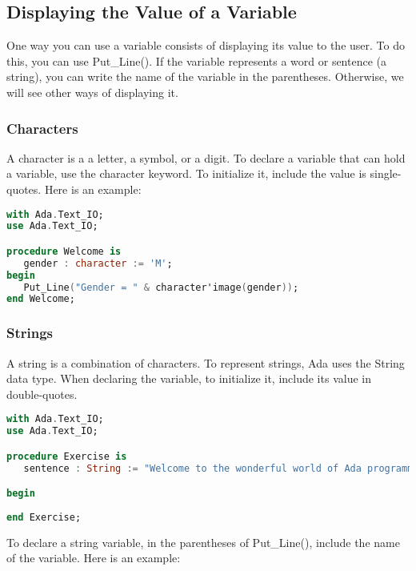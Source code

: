 \documentclass[12pt]{book}
\begin{document}
\subsection{Displaying the Value of a Variable}

One way you can use a variable consists of displaying its value to the user. To do this, you can use Put\_Line(). If the variable represents a word or sentence (a string), you can write the name of the variable in the parentheses. Otherwise, we will see other ways of displaying it.

\subsubsection{Characters}

A character is a a letter, a symbol, or a digit. To declare a variable that can hold a variable, use the character keyword. To initialize it, include the value is single-quotes. Here is an example:

\lstset{style=mystyle}
\begin{lstlisting}[language=Ada, caption=Ada example]
with Ada.Text_IO;
use Ada.Text_IO;

procedure Welcome is
   gender : character := 'M';
begin
   Put_Line("Gender = " & character'image(gender));
end Welcome;
\end{lstlisting}



\subsubsection{Strings}

A string is a combination of characters. To represent strings, Ada uses the String data type. When declaring the variable, to initialize it, include its value in double-quotes.



\lstset{style=mystyle}
\begin{lstlisting}[language=Ada, caption=Ada example]
with Ada.Text_IO;
use Ada.Text_IO;

procedure Exercise is
   sentence : String := "Welcome to the wonderful world of Ada programming!";

begin
    
end Exercise;
\end{lstlisting}

\newpage

To declare a string variable, in the parentheses of Put\_Line(), include the name of the variable. Here is an example:
\end{document}
